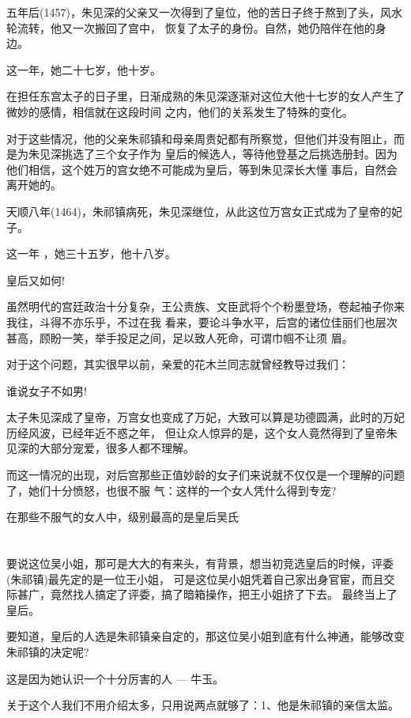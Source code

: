 \documentclass[11pt,a4paper,onecolumn]{article}
\begin{document}
五年后(1457)，朱见深的父亲又一次得到了皇位，他的苦日子终于熬到了头，风水轮流转，他又一次搬回了宫中，
恢复了太子的身份。自然，她仍陪伴在他的身边。

这一年，她二十七岁，他十岁。

在担任东宫太子的日子里，日渐成熟的朱见深逐渐对这位大他十七岁的女人产生了微妙的感情，相信就在这段时间
之内，他们的关系发生了特殊的变化。

对于这些情况，他的父亲朱祁镇和母亲周贵妃都有所察觉，但他们并没有阻止，而是为朱见深挑选了三个女子作为
皇后的候选人，等待他登基之后挑选册封。因为他们相信，这个姓万的宫女绝不可能成为皇后，等到朱见深长大懂
事后，自然会离开她的。

天顺八年(1464)，朱祁镇病死，朱见深继位，从此这位万宫女正式成为了皇帝的妃子。

这一年 ，她三十五岁，他十八岁。

皇后又如何!

虽然明代的宫廷政治十分复杂，王公贵族、文臣武将个个粉墨登场，卷起袖子你来我往，斗得不亦乐乎，不过在我
看来，要论斗争水平，后宫的诸位佳丽们也层次甚高，顾盼一笑，举手投足之间，足以致人死命，可谓巾帼不让须
眉。

对于这个问题，其实很早以前，亲爱的花木兰同志就曾经教导过我们：

谁说女子不如男!

太子朱见深成了皇帝，万宫女也变成了万妃，大致可以算是功德圆满，此时的万妃历经风波，已经年近不惑之年，
但让众人惊异的是，这个女人竟然得到了皇帝朱见深的大部分宠爱，很多人都不理解。

而这一情况的出现，对后宫那些正值妙龄的女子们来说就不仅仅是一个理解的问题了，她们十分愤怒，也很不服
气：这样的一个女人凭什么得到专宠?

在那些不服气的女人中，级别最高的是皇后吴氏

\section[\thesection]{}

要说这位吴小姐，那可是大大的有来头，有背景，想当初竞选皇后的时候，评委(朱祁镇)最先定的是一位王小姐，
可是这位吴小姐凭着自己家出身官宦，而且交际甚广，竟然找人搞定了评委，搞了暗箱操作，把王小姐挤了下去。
最终当上了皇后。

要知道，皇后的人选是朱祁镇亲自定的，那这位吴小姐到底有什么神通，能够改变朱祁镇的决定呢?

这是因为她认识一个十分厉害的人 --- 牛玉。

关于这个人我们不用介绍太多，只用说两点就够了：1、他是朱祁镇的亲信太监。
\end{document}
